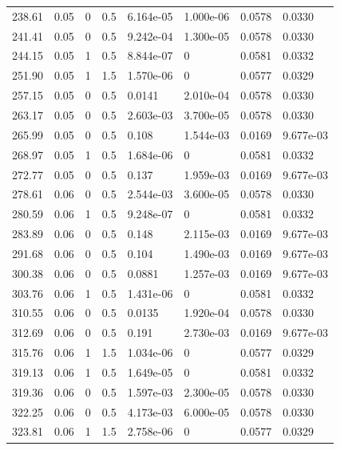 \documentclass[preview]{standalone}
\begin{document}
{{{\begin{tabular}{L{1.2cm}C{1.2cm} C{0.3cm}C{0.5cm} C{1.4cm}C{1.4cm} C{1.4cm}C{1.4cm}}
  238.61  &  0.05  & 0     & 0.5 &  6.164e-05  & 1.000e-06  & 0.0578 &  0.0330   \\ 
  241.41  &  0.05  & 0     & 0.5 &  9.242e-04  & 1.300e-05  & 0.0578 &  0.0330   \\ 
  244.15  &  0.05  & 1     & 0.5 &  8.844e-07  & 0  & 0.0581 &  0.0332   \\ 
  251.90  &  0.05  & 1     & 1.5 &  1.570e-06  & 0  & 0.0577 &  0.0329   \\ 
  257.15  &  0.05  & 0     & 0.5 &  0.0141  & 2.010e-04  & 0.0578 &  0.0330   \\ 
  263.17  &  0.05  & 0     & 0.5 &  2.603e-03  & 3.700e-05  & 0.0578 &  0.0330   \\ 
  265.99  &  0.05  & 0     & 0.5 &  0.108  & 1.544e-03  & 0.0169 &  9.677e-03   \\ 
  268.97  &  0.05  & 1     & 0.5 &  1.684e-06  & 0  & 0.0581 &  0.0332   \\ 
  272.77  &  0.05  & 0     & 0.5 &  0.137  & 1.959e-03  & 0.0169 &  9.677e-03   \\ 
  278.61  &  0.06  & 0     & 0.5 &  2.544e-03  & 3.600e-05  & 0.0578 &  0.0330   \\ 
  280.59  &  0.06  & 1     & 0.5 &  9.248e-07  & 0  & 0.0581 &  0.0332   \\ 
  283.89  &  0.06  & 0     & 0.5 &  0.148  & 2.115e-03  & 0.0169 &  9.677e-03   \\ 
  291.68  &  0.06  & 0     & 0.5 &  0.104  & 1.490e-03  & 0.0169 &  9.677e-03   \\ 
  300.38  &  0.06  & 0     & 0.5 &  0.0881  & 1.257e-03  & 0.0169 &  9.677e-03   \\ 
  303.76  &  0.06  & 1     & 0.5 &  1.431e-06  & 0  & 0.0581 &  0.0332   \\ 
  310.55  &  0.06  & 0     & 0.5 &  0.0135  & 1.920e-04  & 0.0578 &  0.0330   \\ 
  312.69  &  0.06  & 0     & 0.5 &  0.191  & 2.730e-03  & 0.0169 &  9.677e-03   \\ 
  315.76  &  0.06  & 1     & 1.5 &  1.034e-06  & 0  & 0.0577 &  0.0329   \\ 
  319.13  &  0.06  & 1     & 0.5 &  1.649e-05  & 0  & 0.0581 &  0.0332   \\ 
  319.36  &  0.06  & 0     & 0.5 &  1.597e-03  & 2.300e-05  & 0.0578 &  0.0330   \\ 
  322.25  &  0.06  & 0     & 0.5 &  4.173e-03  & 6.000e-05  & 0.0578 &  0.0330   \\ 
  323.81  &  0.06  & 1     & 1.5 &  2.758e-06  & 0  & 0.0577 &  0.0329   \\ 

\end{tabular}}}}
\end{document}
